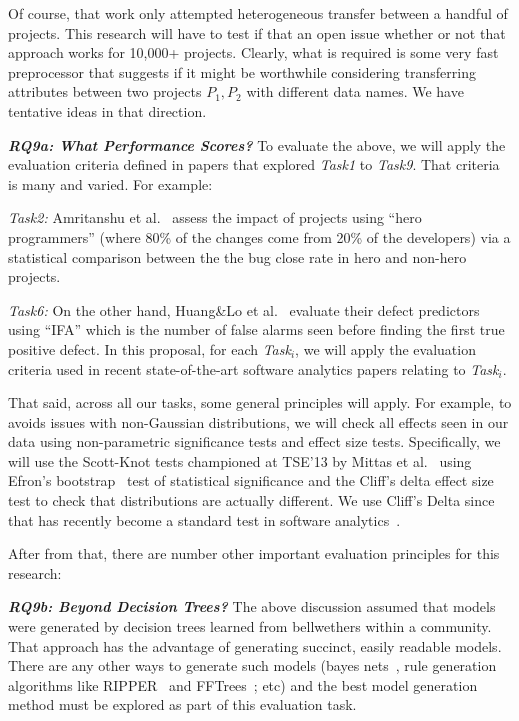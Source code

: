 Of course, that work only attempted heterogeneous transfer between a handful of projects.
This research will have to test if that an open issue whether or not that approach
works for 10,000+ projects.
Clearly, what is required is some very fast preprocessor that suggests 
if it might be worthwhile considering transferring attributes between
two projects $P_1,P_2$ with different data names. We have tentative ideas in that direction.



\textit{\textbf{ RQ9a: What Performance Scores? }}To evaluate the above, we will apply the evaluation criteria defined in papers that explored {\em Task1} to {\em Task9}. That
criteria is many and varied. For example:
\bi
\item
{\em Task2:} Amritanshu et al.~\cite{agrawal17hero}   assess the impact of projects using   ``hero programmers'' (where 80\% of the changes come from 20\% of the developers) via a statistical
comparison between the   
the bug close rate in hero and non-hero projects. 
\item
{\em Task6:} On the other hand, Huang\&Lo et al.~\cite{huang} evaluate their defect predictors   using ``IFA'' which is the number of false alarms seen before finding the first true positive defect.
\ei
In this proposal, for each {\em Task$_i$}, 
we will apply the  evaluation criteria used in recent state-of-the-art software analytics papers relating to {\em Task$_i$}.

That said, across all our tasks, some general principles will apply.
For example, 
to avoids issues with non-Gaussian
distributions, we will check all effects seen in our data using
 non-parametric significance tests and effect size tests. Specifically,
 we will use the Scott-Knot tests championed at TSE'13 by 
 Mittas et al.~\cite{Mittas13} using Efron's bootstrap~\cite{efron93} test of statistical significance and the Cliff's
delta effect size test to check that distributions are actually different. We use Cliff's Delta since that has
recently become a standard test in software analytics~\cite{Gh15}.

After from that, there are number other important evaluation principles for this research:

\textit{\textbf{RQ9b: Beyond Decision Trees?}}
The above discussion assumed that models were generated by decision trees learned from bellwethers within a community. That approach has the advantage of generating succinct, easily readable models.  There are any other ways to generate such models (bayes nets~\cite{misirli2014bayesian}, 
rule generation algorithms like RIPPER~\cite{cohen1999simple} and FFTrees~\cite{chen2018applications}; etc) and the best model generation method
must be explored as part of this evaluation task.


